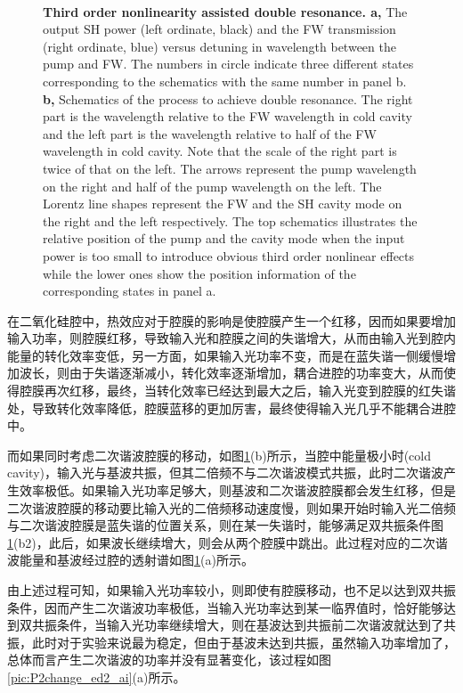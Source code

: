 \documentclass[UTF8,a4paper,cs4size,hyperref]{ctexart}
\begin{document}
\begin{figure}
\includegraphics[width=0cm]{try_ed2}
\caption{\textbf{Third order nonlinearity assisted double resonance. a,} The output SH power (left ordinate, black) and the FW transmission (right ordinate, blue) versus detuning in wavelength between the pump and FW. The numbers in circle indicate three different states corresponding to the schematics with the same number in panel b. \textbf{b,} Schematics of the process to achieve double resonance. The right part is the wavelength relative to the FW wavelength in cold cavity and the left part is the wavelength relative to half of the FW wavelength in cold cavity. Note that the scale of the right part is twice of that on the left. The arrows represent the pump wavelength on the right and half of the pump wavelength on the left. The Lorentz line shapes represent the FW and the SH cavity mode on the right and the left respectively. The top schematics illustrates the relative position of the pump and the cavity mode when the input power is too small to introduce obvious third order nonlinear effects while the lower ones show the position information of the corresponding states in panel a.}
\label{pic:try_ed2}
\end{figure}

在二氧化硅腔中，热效应对于腔膜的影响是使腔膜产生一个红移，因而如果要增加输入功率，则腔膜红移，导致输入光和腔膜之间的失谐增大，从而由输入光到腔内能量的转化效率变低，另一方面，如果输入光功率不变，而是在蓝失谐一侧缓慢增加波长，则由于失谐逐渐减小，转化效率逐渐增加，耦合进腔的功率变大，从而使得腔膜再次红移，最终，当转化效率已经达到最大之后，输入光变到腔膜的红失谐处，导致转化效率降低，腔膜蓝移的更加厉害，最终使得输入光几乎不能耦合进腔中\cite{carmon2004dynamical}。

而如果同时考虑二次谐波腔膜的移动，如图\ref{pic:try_ed2}(b)所示，当腔中能量极小时(cold cavity)，输入光与基波共振，但其二倍频不与二次谐波模式共振，此时二次谐波产生效率极低。如果输入光功率足够大，则基波和二次谐波腔膜都会发生红移，但是二次谐波腔膜的移动要比输入光的二倍频移动速度慢，则如果开始时输入光二倍频与二次谐波腔膜是蓝失谐的位置关系，则在某一失谐时，能够满足双共振条件图\ref{pic:try_ed2}(b2)，此后，如果波长继续增大，则会从两个腔膜中跳出。此过程对应的二次谐波能量和基波经过腔的透射谱如图\ref{pic:try_ed2}(a)所示。

由上述过程可知，如果输入光功率较小，则即使有腔膜移动，也不足以达到双共振条件，因而产生二次谐波功率极低，当输入光功率达到某一临界值时，恰好能够达到双共振条件，当输入光功率继续增大，则在基波达到共振前二次谐波就达到了共振，此时对于实验来说最为稳定，但由于基波未达到共振，虽然输入功率增加了，总体而言产生二次谐波的功率并没有显著变化，该过程如图\ref{pic:P2change_ed2_ai}(a)所示。
\end{document}
